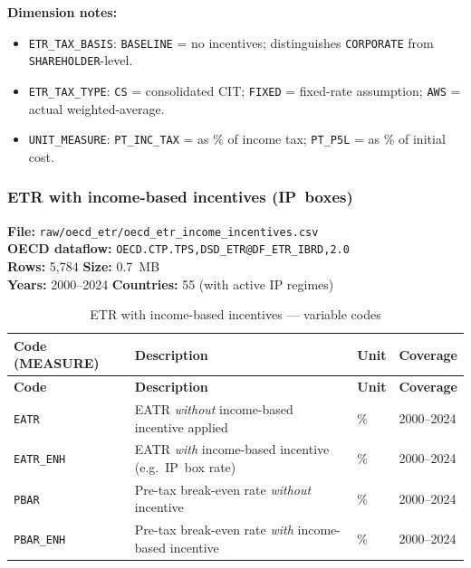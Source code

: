 \documentclass[11pt,a4paper]{article}
\newcommand{\code}[1]{\texttt{#1}}
\begin{document}
\noindent\textbf{Dimension notes:}
\begin{itemize}[noitemsep]
    \item \texttt{ETR\_TAX\_BASIS}: \texttt{BASELINE} = no incentives; distinguishes \texttt{CORPORATE} from \texttt{SHAREHOLDER}-level.
    \item \texttt{ETR\_TAX\_TYPE}: \texttt{CS} = consolidated CIT; \texttt{FIXED} = fixed-rate assumption; \texttt{AWS} = actual weighted-average.
    \item \texttt{UNIT\_MEASURE}: \texttt{PT\_INC\_TAX} = as \% of income tax; \texttt{PT\_P5L} = as \% of initial cost.
\end{itemize}

\subsubsection{ETR with income-based incentives (IP~boxes)}

\textbf{File:} \texttt{raw/oecd\_etr/oecd\_etr\_income\_incentives.csv}\\
\textbf{OECD dataflow:} \texttt{OECD.CTP.TPS,DSD\_ETR@DF\_ETR\_IBRD,2.0}\\
\textbf{Rows:} 5{,}784 \quad \textbf{Size:} 0.7~MB\\
\textbf{Years:} 2000--2024 \quad \textbf{Countries:} 55 (with active IP regimes)

\begin{longtable}{@{}L{3.2cm} L{6.0cm} C{2.0cm} C{2.5cm}@{}}
\caption{ETR with income-based incentives --- variable codes}\label{tab:etr_income}\\
\toprule
\textbf{Code (MEASURE)} & \textbf{Description} & \textbf{Unit} & \textbf{Coverage} \\
\midrule
\endfirsthead
\toprule
\textbf{Code} & \textbf{Description} & \textbf{Unit} & \textbf{Coverage} \\
\midrule
\endhead
\bottomrule
\endlastfoot
\code{EATR}       & EATR \emph{without} income-based incentive applied & \% & 2000--2024 \\
\code{EATR\_ENH}  & EATR \emph{with} income-based incentive (e.g.\ IP~box rate) & \% & 2000--2024 \\
\code{PBAR}       & Pre-tax break-even rate \emph{without} incentive & \% & 2000--2024 \\
\code{PBAR\_ENH}  & Pre-tax break-even rate \emph{with} income-based incentive & \% & 2000--2024 \\
\end{longtable}
\end{document}
